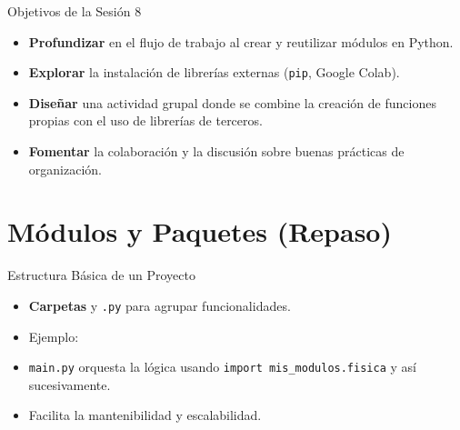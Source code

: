 \documentclass[10pt]{beamer}
\begin{document}
\begin{frame}{Objetivos de la Sesión 8}
  \begin{itemize}
    \item \textbf{Profundizar} en el flujo de trabajo al crear y reutilizar módulos en Python.
    \item \textbf{Explorar} la instalación de librerías externas (\texttt{pip}, Google Colab).
    \item \textbf{Diseñar} una actividad grupal donde se combine la creación de funciones propias con el uso de librerías de terceros.
    \item \textbf{Fomentar} la colaboración y la discusión sobre buenas prácticas de organización.
  \end{itemize}
\end{frame}

\section{Módulos y Paquetes (Repaso)}

\begin{frame}{Estructura Básica de un Proyecto}
  \begin{itemize}
    \item \textbf{Carpetas} y \texttt{.py} para agrupar funcionalidades.
    \item Ejemplo:
    \item \texttt{main.py} orquesta la lógica usando \texttt{import mis\_modulos.fisica} y así sucesivamente.
    \item Facilita la mantenibilidad y escalabilidad.
  \end{itemize}
\end{frame}
\end{document}
